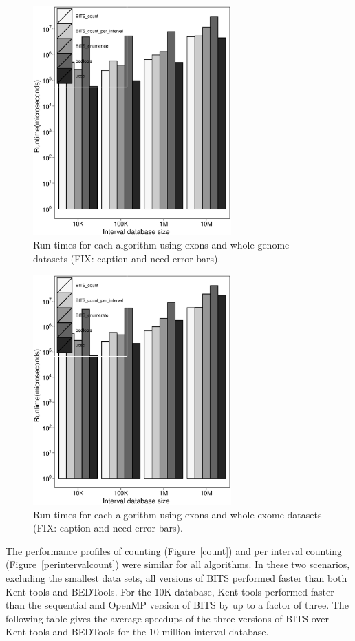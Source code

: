 \documentclass{bioinfo}
\begin{document}
		\begin{figure}[h]
			\centering
			\includegraphics[width=3in]{figures/exons-v-genome.eps}
			\caption[]{Run times for each algorithm using exons and whole-genome datasets (FIX: caption and need error bars).}
		\end{figure}
		
		\begin{figure}[h]
			\centering
			\includegraphics[width=3in]{figures/exons-v-exome.eps}
			\caption[]{Run times for each algorithm using exons and whole-exome datasets (FIX: caption and need error bars).}
		\end{figure}

		The performance profiles of counting (Figure~\ref{count}) and per interval
		counting (Figure~\ref{perintervalcount}) were similar for all algorithms.
		In these two scenarios, excluding the smallest data sets, all versions of BITS
		performed faster than both Kent tools and BEDTools.  For the 10K database, Kent
		tools performed faster than the sequential and OpenMP version of BITS by up to a
		factor of three.  The following table gives the average speedups of the three
		versions of BITS over Kent tools and BEDTools for the 10 million interval
		database.
\end{document}
